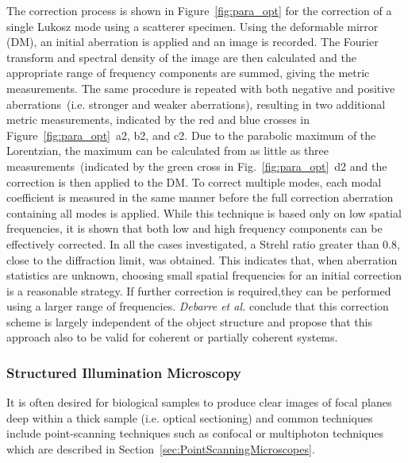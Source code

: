 The correction process is shown in Figure~\ref{fig:para_opt} for the correction of a single Lukosz mode using a scatterer specimen. Using the deformable mirror (DM), an initial aberration is applied and an image is recorded. The Fourier transform and spectral density of the image are then calculated and the appropriate range of frequency components are summed, giving the metric measurements. The same procedure is repeated with both negative and positive aberrations~(i.e. stronger and weaker aberrations), resulting in two additional metric measurements, indicated by the red and blue crosses in Figure~\ref{fig:para_opt}~a2, b2, and c2. Due to the parabolic maximum of the Lorentzian, the maximum can be calculated from as little as three measurements~(indicated by the green cross in Fig.~\ref{fig:para_opt}~d2 and the correction is then applied to the DM. To correct multiple modes, each modal coefficient is measured in the same manner before the full correction aberration containing all modes is applied. While this technique is based only on low spatial frequencies, it is shown that both low and high frequency components can be effectively corrected. In all the cases investigated, a Strehl ratio greater than 0.8, close to the diffraction limit, was obtained. This indicates that, when aberration statistics are unknown, choosing small spatial frequencies for an initial correction is a reasonable strategy. If further correction is required,they can be performed using a larger range of frequencies. \emph{Debarre et al.} conclude that this correction scheme is largely independent of the object structure and propose that this approach also to be valid for coherent or partially coherent systems.

\subsubsection{Structured Illumination Microscopy}
\label{sec:StructuredIlluminationMicroscopy}

It is often desired for biological samples to produce clear images of focal planes deep within a thick sample (i.e. optical sectioning) and common techniques include point-scanning techniques such as confocal or multiphoton techniques which are described in Section~\ref{sec:PointScanningMicroscopes}. 

